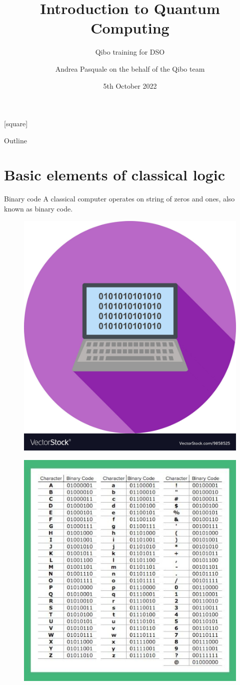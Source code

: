 \documentclass[11p,aspectratio=169]{beamer}
\title{Introduction to Quantum Computing}
\subtitle{Qibo training for DSO}
\author{Andrea Pasquale on the behalf of the Qibo team}
\date{5th October 2022}
\begin{document}
\maketitle

[square]
\begin{frame}{Outline}
\tableofcontents
\end{frame}

\section{Basic elements of classical logic}
\begin{frame}{Binary code}
    A classical computer operates on string of zeros and ones, also known as binary code.
    \begin{multicols*}{2}
        \begin{figure}
            \includegraphics[width=0.5 \textwidth]{figures/binary_code.jpg}
        \end{figure}  

        \begin{figure}
            \includegraphics[width=0.5 \textwidth]{figures/binary.jpg}
        \end{figure}  
    \end{multicols*}
    
    
\end{frame}
\end{document}
